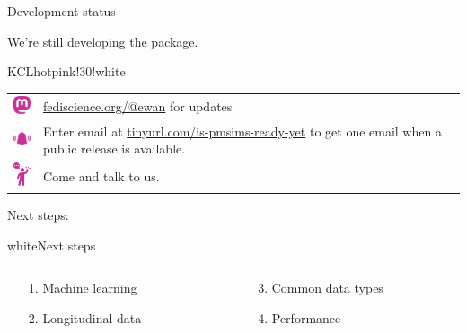 \documentclass[11pt]{beamer}
\newcommand*{\colitem}[2]{%
    \item[\textcolor{#1}{\textbullet}] \textcolor{#1}{#2}
}
\begin{document}
\begin{frame}[t]{Development status}

	We're still developing the package.


	\begin{cbox}[colframe=KCLhotpink!50!white]{KCLhotpink!30!white}{}

		\begin{tabular}{cp{}}
			\includegraphics[width=2em,valign=c]{figures/mastodon.pdf} &
			\href{https://fediscience.org/@ewan}{\textcolor{KCLhotpink}{fediscience.org/@ewan}}
			for updates                                                  \\[1.6em]
			\includegraphics[width=2em,valign=c]{figures/bell.pdf}     &
			Enter email at
			\href{https://tinyurl.com/is-pmsims-ready-yet}{\textcolor{KCLhotpink}{tinyurl.com/is-pmsims-ready-yet}}
			to get one email when a public release is available.         \\[1.6em]
			\includegraphics[width=2em,valign=c]{figures/hi.pdf}       &
			Come and talk to us.
		\end{tabular}
	\end{cbox}

	Next steps:\


	\begin{cbox}{white}{Next steps}
		\begin{columns}
			\begin{column}[T]{0.45\textwidth}
				\begin{enumerate}
					\item[1.] \textcolor{KCLpurple}{Machine learning}
					\item[2.] \textcolor{KCLpurple}{Longitudinal data}
				\end{enumerate}
			\end{column}
			\begin{column}[T]{0.45\textwidth}
				\begin{enumerate}
					\item[3.] \textcolor{KCLpurple}{Common data types}
					\item[4.] \textcolor{KCLpurple}{Performance}
				\end{enumerate}
			\end{column}
		\end{columns}
	\end{cbox}


\end{frame}
\end{document}
